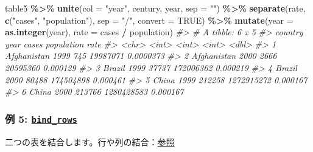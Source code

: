 \documentclass[
  xelatex, ja=standard]{bxjsbook}
\newenvironment{Shaded}{\begin{snugshade}}{\end{snugshade}}
\newcommand{\AttributeTok}[1]{\textcolor[rgb]{0.13,0.29,0.53}{#1}}
\newcommand{\CommentTok}[1]{\textcolor[rgb]{0.56,0.35,0.01}{\textit{#1}}}
\newcommand{\ConstantTok}[1]{\textcolor[rgb]{0.56,0.35,0.01}{#1}}
\newcommand{\FunctionTok}[1]{\textcolor[rgb]{0.13,0.29,0.53}{\textbf{#1}}}
\newcommand{\NormalTok}[1]{#1}
\newcommand{\SpecialCharTok}[1]{\textcolor[rgb]{0.81,0.36,0.00}{\textbf{#1}}}
\newcommand{\StringTok}[1]{\textcolor[rgb]{0.31,0.60,0.02}{#1}}
\theoremstyle{definition}
\theoremstyle{definition}
\theoremstyle{definition}
\theoremstyle{definition}
\theoremstyle{remark}
\begin{document}
\begin{Shaded}
\begin{Highlighting}[]
\NormalTok{table5 }\SpecialCharTok{\%\textgreater{}\%} \FunctionTok{unite}\NormalTok{(}\AttributeTok{col =} \StringTok{"year"}\NormalTok{, century, year, }\AttributeTok{sep =} \StringTok{""}\NormalTok{) }\SpecialCharTok{\%\textgreater{}\%}
  \FunctionTok{separate}\NormalTok{(rate, }\FunctionTok{c}\NormalTok{(}\StringTok{"cases"}\NormalTok{, }\StringTok{"population"}\NormalTok{), }\AttributeTok{sep =} \StringTok{"/"}\NormalTok{, }
           \AttributeTok{convert =} \ConstantTok{TRUE}\NormalTok{) }\SpecialCharTok{\%\textgreater{}\%}
  \FunctionTok{mutate}\NormalTok{(}\AttributeTok{year =} \FunctionTok{as.integer}\NormalTok{(year), }\AttributeTok{rate =}\NormalTok{ cases }\SpecialCharTok{/}\NormalTok{ population)}
\CommentTok{\#\textgreater{} \# A tibble: 6 x 5}
\CommentTok{\#\textgreater{}   country      year  cases population      rate}
\CommentTok{\#\textgreater{}   \textless{}chr\textgreater{}       \textless{}int\textgreater{}  \textless{}int\textgreater{}      \textless{}int\textgreater{}     \textless{}dbl\textgreater{}}
\CommentTok{\#\textgreater{} 1 Afghanistan  1999    745   19987071 0.0000373}
\CommentTok{\#\textgreater{} 2 Afghanistan  2000   2666   20595360 0.000129 }
\CommentTok{\#\textgreater{} 3 Brazil       1999  37737  172006362 0.000219 }
\CommentTok{\#\textgreater{} 4 Brazil       2000  80488  174504898 0.000461 }
\CommentTok{\#\textgreater{} 5 China        1999 212258 1272915272 0.000167 }
\CommentTok{\#\textgreater{} 6 China        2000 213766 1280428583 0.000167}
\end{Highlighting}
\end{Shaded}

\hypertarget{ux4f8b-5-bind_rows}{%
\subsubsection{\texorpdfstring{例 5: \href{https://dplyr.tidyverse.org/reference/bind.html}{\texttt{bind\_rows}}}{例 5: bind\_rows}}\label{ux4f8b-5-bind_rows}}

二つの表を結合します。行や列の結合：\href{https://dplyr.tidyverse.org/reference/bind.html}{参照}
\end{document}
